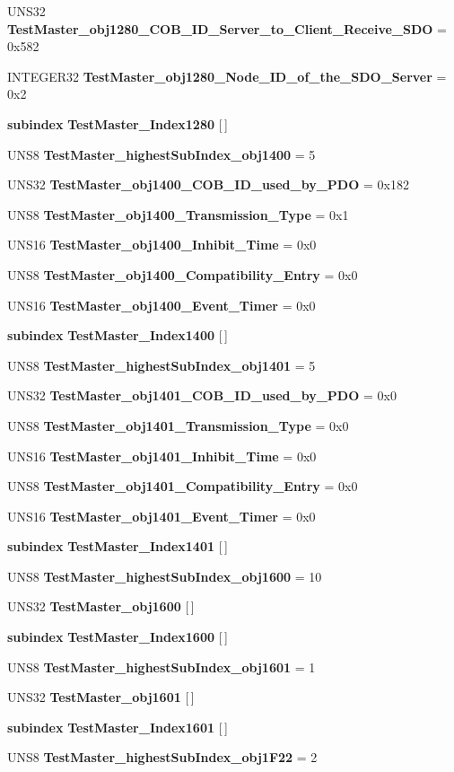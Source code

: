 \begin{CompactItemize}
\item 
UNS32 {\bf Test\-Master\_\-obj1280\_\-COB\_\-ID\_\-Server\_\-to\_\-Client\_\-Receive\_\-SDO} = 0x582
\item 
INTEGER32 {\bf Test\-Master\_\-obj1280\_\-Node\_\-ID\_\-of\_\-the\_\-SDO\_\-Server} = 0x2
\item 
{\bf subindex} {\bf Test\-Master\_\-Index1280} [$\,$]
\item 
UNS8 {\bf Test\-Master\_\-highest\-Sub\-Index\_\-obj1400} = 5
\item 
UNS32 {\bf Test\-Master\_\-obj1400\_\-COB\_\-ID\_\-used\_\-by\_\-PDO} = 0x182
\item 
UNS8 {\bf Test\-Master\_\-obj1400\_\-Transmission\_\-Type} = 0x1
\item 
UNS16 {\bf Test\-Master\_\-obj1400\_\-Inhibit\_\-Time} = 0x0
\item 
UNS8 {\bf Test\-Master\_\-obj1400\_\-Compatibility\_\-Entry} = 0x0
\item 
UNS16 {\bf Test\-Master\_\-obj1400\_\-Event\_\-Timer} = 0x0
\item 
{\bf subindex} {\bf Test\-Master\_\-Index1400} [$\,$]
\item 
UNS8 {\bf Test\-Master\_\-highest\-Sub\-Index\_\-obj1401} = 5
\item 
UNS32 {\bf Test\-Master\_\-obj1401\_\-COB\_\-ID\_\-used\_\-by\_\-PDO} = 0x0
\item 
UNS8 {\bf Test\-Master\_\-obj1401\_\-Transmission\_\-Type} = 0x0
\item 
UNS16 {\bf Test\-Master\_\-obj1401\_\-Inhibit\_\-Time} = 0x0
\item 
UNS8 {\bf Test\-Master\_\-obj1401\_\-Compatibility\_\-Entry} = 0x0
\item 
UNS16 {\bf Test\-Master\_\-obj1401\_\-Event\_\-Timer} = 0x0
\item 
{\bf subindex} {\bf Test\-Master\_\-Index1401} [$\,$]
\item 
UNS8 {\bf Test\-Master\_\-highest\-Sub\-Index\_\-obj1600} = 10
\item 
UNS32 {\bf Test\-Master\_\-obj1600} [$\,$]
\item 
{\bf subindex} {\bf Test\-Master\_\-Index1600} [$\,$]
\item 
UNS8 {\bf Test\-Master\_\-highest\-Sub\-Index\_\-obj1601} = 1
\item 
UNS32 {\bf Test\-Master\_\-obj1601} [$\,$]
\item 
{\bf subindex} {\bf Test\-Master\_\-Index1601} [$\,$]
\item 
UNS8 {\bf Test\-Master\_\-highest\-Sub\-Index\_\-obj1F22} = 2

\end{CompactItemize}
